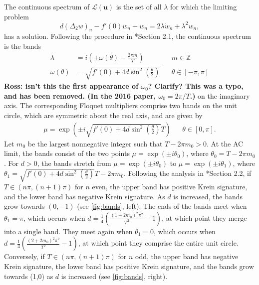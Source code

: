 \documentclass[12pt,reqno]{amsart}
\def\Z{{\mathbb Z}}
\def\calL{\mathcal{L}}
\newcommand{\uvec}{\mathbf{u}}
\theoremstyle{definition}
\begin{document}
The continuous spectrum of $\calL(\uvec)$ is the set of all $\lambda$ for which the limiting problem 
\begin{equation}\label{eq:DKGeigcont}
d (\Delta_2 w)_n - f'(0)w_n - \ddot{w}_n = 2 \lambda \dot{w}_n + \lambda^2 w_n,
\end{equation}
has a solution. Following the procedure in \cite{cuevas-maraver2016}*{Section 2.1}, the continuous spectrum is the bands
\begin{equation}\label{eq:contspec}
\begin{aligned}
\lambda &= i\left( \pm \omega(\theta) - \frac{2 \pi m}{T} \right) && m \in \Z \\
\omega(\theta) &= \sqrt{ f'(0) + 4 d \sin^2\left( \frac{\theta}{2} \right) } && \theta \in [-\pi, \pi]
\end{aligned}
\end{equation}
{\bf Ross: isn't this the first appearance of $\omega_0$? Clarify? This was a typo, and has been removed. (In the 2016 paper, $\omega_0 = 2\pi/T$.)}
on the imaginary axis. The corresponding Floquet multipliers comprise two bands on the unit circle,  which are symmetric about the real axis, and are given by
\begin{equation}\label{eq:contspecmult}
\begin{aligned}
\mu = \exp \left( \pm i \sqrt{f'(0) + 4 d \sin^2 \left(\frac{\theta}{2}\right) }T \right)  && \theta \in [0, \pi].
\end{aligned}
\end{equation}
Let $m_0$ be the largest nonnegative integer such that $T - 2 \pi m_0 > 0$. At the AC limit, the bands consist of the two points $\mu = \exp(\pm i \theta_0)$, where $\theta_0 =  T - 2 \pi m_0$. For $d>0$, the bands stretch from $\mu = \exp(\pm i \theta_0)$ to $\mu = \exp(\pm i \theta_1)$, where $\theta_1 = \sqrt{f'(0) + 4 d \sin^2 \left(\frac{\theta}{2}\right) }T - 2 \pi m_0$. Following the analysis in \cite{cuevas-maraver2016}*{Section 2.2}, if $T \in (n \pi, (n+1)\pi)$ for $n$ even, the upper band has positive Krein signature, and the lower band has negative Krein signature. As $d$ is increased, the bands grow towards $(0,-1)$ (see \cref{fig:bands}, left). The ends of the bands meet when $\theta_1 = \pi$, which occurs when $d = \frac{1}{4} \left( \frac{(1 + 2 m_0)^2 \pi^2}{T^2} - 1\right)$, at which point they merge into a single band. They meet again when $\theta_1 = 0$, which occurs when $d = \frac{1}{4} \left( \frac{(2 + 2 m_0)^2 \pi^2}{T^2} - 1\right)$, at which point they comprise the entire unit circle.
Conversely, if $T \in (n \pi, (n+1)\pi)$ for $n$ odd, the upper band has negative Krein signature, the lower band has positive Krein signature, and the bands grow towards (1,0) as $d$ is increased (see \cref{fig:bands}, right).
\end{document}
